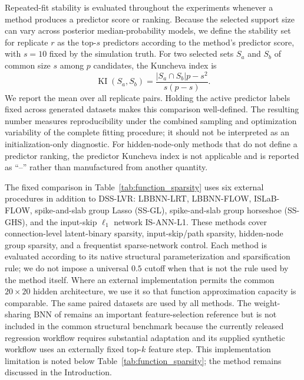 Repeated-fit stability is evaluated throughout the experiments whenever a method produces a predictor score or ranking. Because the selected support size can vary across posterior median-probability models, we define the stability set for replicate $r$ as the top-$s$ predictors according to the method's predictor score, with $s=10$ fixed by the simulation truth. For two selected sets $S_a$ and $S_b$ of common size $s$ among $p$ candidates, the Kuncheva index is
\[
    \operatorname{KI}(S_a,S_b)=\frac{|S_a\cap S_b|p-s^2}{s(p-s)}.
\]
We report the mean over all replicate pairs. Holding the active predictor labels fixed across generated datasets makes this comparison well-defined. The resulting number measures reproducibility under the combined sampling and optimization variability of the complete fitting procedure; it should not be interpreted as an initialization-only diagnostic. For hidden-node-only methods that do not define a predictor ranking, the predictor Kuncheva index is not applicable and is reported as ``--'' rather than manufactured from another quantity.

The fixed comparison in Table~\ref{tab:function_sparsity} uses six external procedures in addition to DSS-LVR: LBBNN-LRT, LBBNN-FLOW, ISLaB-FLOW, spike-and-slab group Lasso (SS-GL), spike-and-slab group horseshoe (SS-GHS), and the input-skip $\ell_1$ network IS-ANN-L1. These methods cover connection-level latent-binary sparsity, input-skip/path sparsity, hidden-node group sparsity, and a frequentist sparse-network control. Each method is evaluated according to its native structural parameterization and sparsification rule; we do not impose a universal $0.5$ cutoff when that is not the rule used by the method itself. Where an external implementation permits the common $20\times20$ hidden architecture, we use it so that function approximation capacity is comparable. The same paired datasets are used by all methods. The weight-sharing BNN of \citet{mishra2026weightsharing} remains an important feature-selection reference but is not included in the common structural benchmark because the currently released regression workflow requires substantial adaptation and its supplied synthetic workflow uses an externally fixed top-$k$ feature step. This implementation limitation is noted below Table~\ref{tab:function_sparsity}; the method remains discussed in the Introduction.

